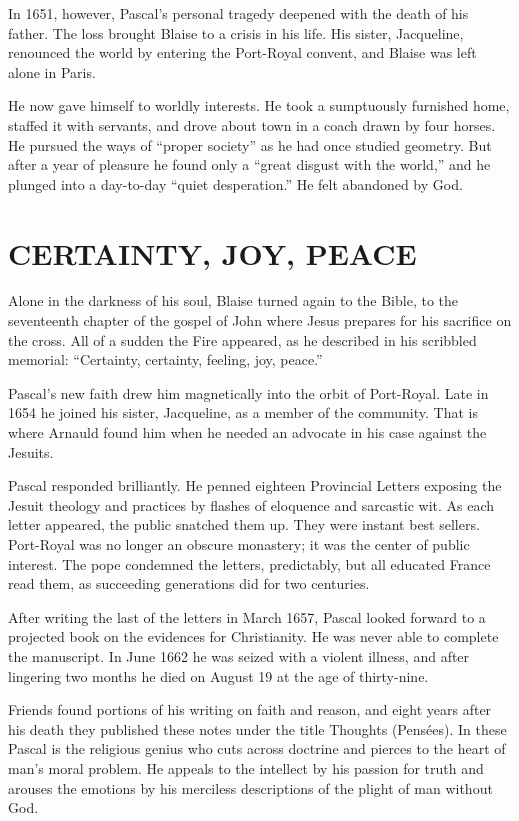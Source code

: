 In 1651, however, Pascal’s personal tragedy deepened with the death of his father. The loss brought
Blaise to a crisis in his life. His sister, Jacqueline, renounced the world by entering the
Port-Royal convent, and Blaise was left alone in Paris.

He now gave himself to worldly interests. He took a sumptuously furnished home, staffed it with
servants, and drove about town in a coach drawn by four horses. He pursued the ways of “proper
society” as he had once studied geometry. But after a year of pleasure he found only a “great
disgust with the world,” and he plunged into a day-to-day “quiet desperation.” He felt abandoned by
God.

\section{CERTAINTY, JOY, PEACE}

Alone in the darkness of his soul, Blaise turned again to the Bible, to the seventeenth chapter of
the gospel of John where Jesus prepares for his sacrifice on the cross. All of a sudden the Fire
appeared, as he described in his scribbled memorial: “Certainty, certainty, feeling, joy, peace.”

Pascal’s new faith drew him magnetically into the orbit of Port-Royal. Late in 1654 he joined his
sister, Jacqueline, as a member of the community. That is where Arnauld found him when he needed an
advocate in his case against the Jesuits.

Pascal responded brilliantly. He penned eighteen Provincial Letters exposing the Jesuit theology and
practices by flashes of eloquence and sarcastic wit. As each letter appeared, the public snatched
them up. They were instant best sellers. Port-Royal was no longer an obscure monastery; it was the
center of public interest. The pope condemned the letters, predictably, but all educated France read
them, as succeeding generations did for two centuries.

After writing the last of the letters in March 1657, Pascal looked forward to a projected book on
the evidences for Christianity. He was never able to complete the manuscript. In June 1662 he was
seized with a violent illness, and after lingering two months he died on August 19 at the age of
thirty-nine.

Friends found portions of his writing on faith and reason, and eight years after his death they
published these notes under the title Thoughts (Pensées). In these Pascal is the religious genius
who cuts across doctrine and pierces to the heart of man’s moral problem. He appeals to the
intellect by his passion for truth and arouses the emotions by his merciless descriptions of the
plight of man without God.


